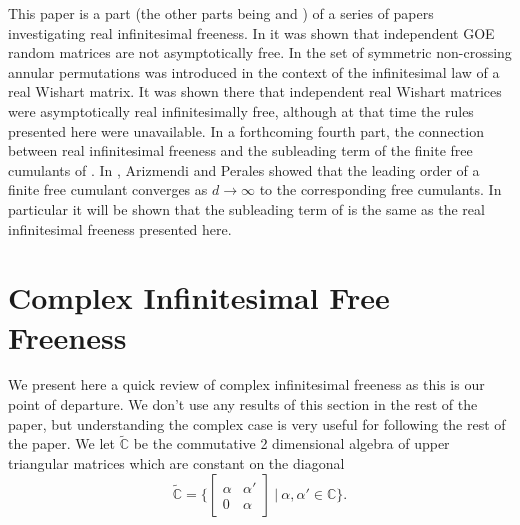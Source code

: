 \documentclass[11pt]{amsart}
\theoremstyle{definition}
\numberwithin{theorem}{section}
\newcommand{\bC}{\mathbb{C}}
\newcommand{\tC}{{\widetilde{\mathbb{C}}}}
\begin{document}
This paper is a part (the other parts being \cite{m} and
\cite{mvb}) of a series of papers investigating real
infinitesimal freeness. In \cite{m} it was shown that
independent GOE random matrices are not asymptotically
free. In \cite{mvb} the set of symmetric non-crossing
annular permutations was introduced in the context of the
infinitesimal law of a real Wishart matrix. It was shown
there that independent real Wishart matrices were
asymptotically real infinitesimally free, although at that
time the rules presented here were unavailable. In a
forthcoming fourth part, the connection between real
infinitesimal freeness and the subleading term of the finite
free cumulants of \cite{ap, agp, apv}. In \cite{ap},
Arizmendi and Perales showed that the leading order of a
finite free cumulant converges as $d \to \infty$ to the
corresponding free cumulants. In particular it will be shown
that the subleading term of \cite{apv} is the same as the
real infinitesimal freeness presented here.


\section{Complex Infinitesimal Free Freeness}
\label{section:infinitesimal_cumulants}

We present here a quick review of complex infinitesimal
freeness as this is our point of departure. We don't use any
results of this section in the rest of the paper, but
understanding the complex case is very useful for following
the rest of the paper. We let $\tC$ be the commutative 2
dimensional algebra of upper triangular matrices which are
constant on the diagonal
\[
\tC = \bigg\{\begin{bmatrix} \alpha & \alpha' \\ 0 &
\alpha \end{bmatrix} \ \bigg\vert\ \alpha, \alpha' \in \bC
\bigg\}.
\]
\end{document}
